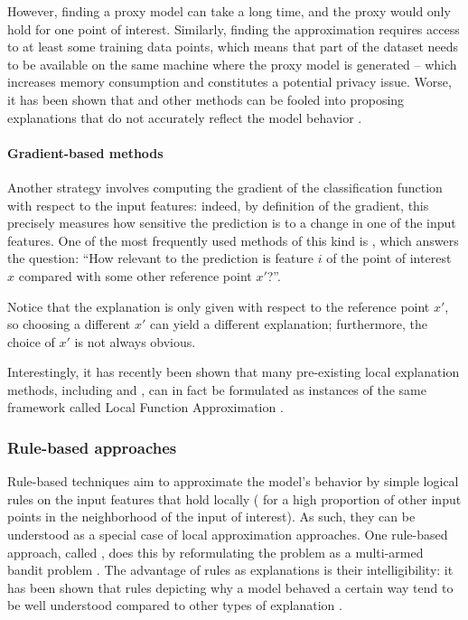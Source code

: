 \documentclass[../main.tex]{subfiles}
\begin{document}
However, finding a proxy model can take a long time, and the proxy would only hold for one point of interest.
Similarly, finding the approximation requires access to at least some training data points, which means that part of the dataset needs to be available on the same machine where the proxy model is generated -- which increases memory consumption and constitutes a potential privacy issue.
Worse, it has been shown that  and other methods can be fooled into proposing explanations that do not accurately reflect the model behavior \cite{slackFooling2020}.

\paragraph{Gradient-based methods}

Another strategy involves computing the gradient of the classification function with respect to the input features: indeed, by definition of the gradient, this precisely measures how sensitive the prediction is to a change in one of the input features.
One of the most frequently used methods of this kind is  \cite{sundararajanAxiomatic2017}, which answers the question: ``How relevant to the prediction is feature $i$ of the point of interest $x$ compared with some other reference point $x'$?''.

Notice that the explanation is only given with respect to the reference point $x'$, so choosing a different $x'$ can yield a different explanation; furthermore, the choice of $x'$ is not always obvious.

Interestingly, it has recently been shown that many pre-existing local explanation methods, including  and , can in fact be formulated as instances of the same framework called Local Function Approximation \cite{hanWhich2022}.

\subsubsection{Rule-based approaches}

Rule-based techniques aim to approximate the model's behavior by simple logical rules on the input features that hold locally (\ie{} for a high proportion of other input points in the neighborhood of the input of interest).
As such, they can be understood as a special case of local approximation approaches.
One rule-based approach, called , does this by reformulating the problem as a multi-armed bandit problem \cite{ribeiroAnchors2018}.
The advantage of rules as explanations is their intelligibility: it has been shown that rules depicting why a model behaved a certain way tend to be well understood compared to other types of explanation \cite{limWhy2009}.
\end{document}
